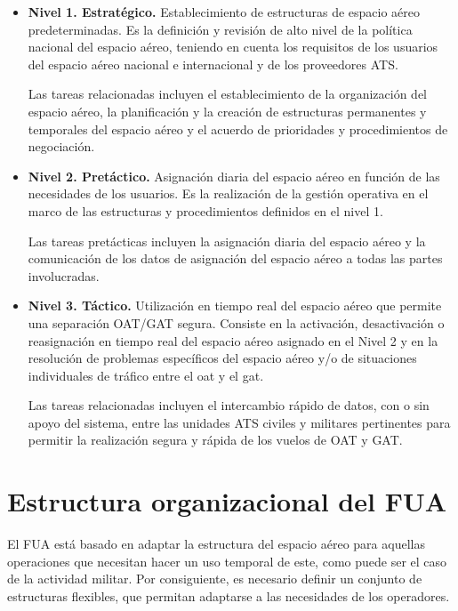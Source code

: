 \begin{itemize}
    \item \textbf{Nivel 1. Estratégico.} Establecimiento de estructuras de espacio aéreo predeterminadas. Es la definición y revisión de alto nivel de la política nacional del espacio aéreo, teniendo en cuenta los requisitos de los usuarios del espacio aéreo nacional e internacional y de los proveedores ATS.
    
    Las tareas relacionadas incluyen el establecimiento de la organización del espacio aéreo, la planificación y la creación de estructuras permanentes y temporales del espacio aéreo y el acuerdo de prioridades y procedimientos de negociación.
    
    \item \textbf{Nivel 2. Pretáctico.} Asignación diaria del espacio aéreo en función de las necesidades de los usuarios. Es la realización de la gestión operativa en el marco de las estructuras y procedimientos definidos en el nivel 1.
    
    Las tareas pretácticas incluyen la asignación diaria del espacio aéreo y la comunicación de los datos de asignación del espacio aéreo a todas las partes involucradas.
    
    \item \textbf{Nivel 3. Táctico.} Utilización en tiempo real del espacio aéreo que permite una separación OAT/GAT segura. Consiste en la activación, desactivación o reasignación en tiempo real del espacio aéreo asignado en el Nivel 2 y en la resolución de problemas específicos del espacio aéreo y/o de situaciones individuales de tráfico entre el \acrfull{oat} y el \acrfull{gat}.
    
    Las tareas relacionadas incluyen el intercambio rápido de datos, con o sin apoyo del sistema, entre las unidades ATS civiles y militares pertinentes para permitir la realización segura y rápida de los vuelos de OAT y GAT.
\end{itemize}

\section{Estructura organizacional del FUA}\label{tit:fua_estructura}

El FUA está basado en adaptar la estructura del espacio aéreo para aquellas operaciones que necesitan hacer un uso temporal de este, como puede ser el caso de la actividad militar. Por consiguiente, es necesario definir un conjunto de estructuras flexibles, que permitan adaptarse a las necesidades de los operadores.

